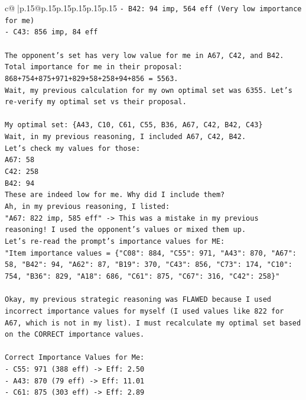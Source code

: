 \documentclass{article}
\begin{document}
{\begin{supertabular}{c@{$\;$}|p{.15\linewidth}@{}p{.15\linewidth}p{.15\linewidth}p{.15\linewidth}p{.15\linewidth}p{.15\linewidth}}
{{{\texttt{{-} B42: 94 imp, 564 eff (Very low importance for me)} \\
\texttt{{-} C43: 856 imp, 84 eff} \\
\\ 
\texttt{The opponent's set has very low value for me in A67, C42, and B42.} \\
\texttt{Total importance for me in their proposal: 868+754+875+971+829+58+258+94+856 = 5563.} \\
\texttt{Wait, my previous calculation for my own optimal set was 6355. Let's re{-}verify my optimal set vs their proposal.} \\
\\ 
\texttt{My optimal set: \{A43, C10, C61, C55, B36, A67, C42, B42, C43\}} \\
\texttt{Wait, in my previous reasoning, I included A67, C42, B42.} \\
\texttt{Let's check my values for those:} \\
\texttt{A67: 58} \\
\texttt{C42: 258} \\
\texttt{B42: 94} \\
\texttt{These are indeed low for me. Why did I include them?} \\
\texttt{Ah, in my previous reasoning, I listed:} \\
\texttt{"A67: 822 imp, 585 eff" {-}> This was a mistake in my previous reasoning! I used the opponent's values or mixed them up.} \\
\texttt{Let's re{-}read the prompt's importance values for ME:} \\
\texttt{"Item importance values = \{"C08": 884, "C55": 971, "A43": 870, "A67": 58, "B42": 94, "A62": 87, "B19": 370, "C43": 856, "C73": 174, "C10": 754, "B36": 829, "A18": 686, "C61": 875, "C67": 316, "C42": 258\}"} \\
\\ 
\texttt{Okay, my previous strategic reasoning was FLAWED because I used incorrect importance values for myself (I used values like 822 for A67, which is not in my list). I must recalculate my optimal set based on the CORRECT importance values.} \\
\\ 
\texttt{Correct Importance Values for Me:} \\
\texttt{{-} C55: 971 (388 eff) {-}> Eff: 2.50} \\
\texttt{{-} A43: 870 (79 eff) {-}> Eff: 11.01} \\
\texttt{{-} C61: 875 (303 eff) {-}> Eff: 2.89} \\
}}}
\end{supertabular}}
\end{document}
